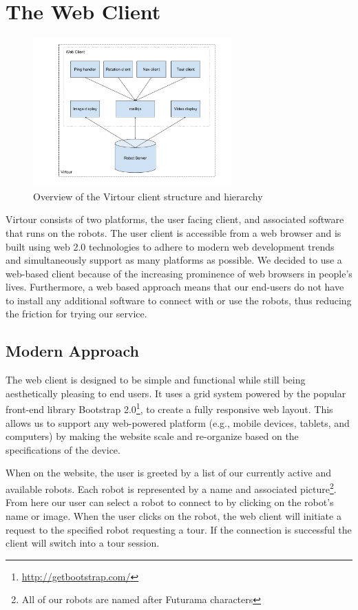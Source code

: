 \documentclass[
  oneside,
  11pt, a4paper,
  footinclude=true,
  headinclude=true,
  cleardoublepage=empty
]{article}
\begin{document}
\section{The Web Client}\label{sec:client}

\begin{figure}
  \centering
  \includegraphics[width=3in]{virtour_client}
  \caption{Overview of the Virtour client structure and hierarchy}
  \label{fig:client}
\end{figure}

Virtour consists of two platforms, the user facing client, and associated
software that runs on the robots. The user client is accessible from a web
browser and is built using web 2.0 technologies to adhere to modern web
development trends and simultaneously support as many platforms as possible. We
decided to use a web-based client because of the increasing prominence of web
browsers in people's lives. Furthermore, a web based approach means that our
end-users do not have to install any additional software to connect with or use
the robots, thus reducing the friction for trying our service.

\subsection{Modern Approach}

The web client is designed to be simple and functional while still being
aesthetically pleasing to end users. It uses a grid system powered by the
popular front-end library Bootstrap
2.0\footnote{\url{http://getbootstrap.com/}}, to create a fully responsive web
layout. This allows us to support any web-powered platform (e.g., mobile
devices, tablets, and computers) by making the website scale and re-organize
based on the specifications of the device.

When on the website, the user is greeted by a list of our currently active and
available robots. Each robot is represented by a name and associated
picture\footnote{All of our robots are named after Futurama characters}. From
here our user can select a robot to connect to by clicking on the robot's name
or image. When the user clicks on the robot, the web client will initiate a
request to the specified robot requesting a tour. If the connection is
successful the client will switch into a tour session.
\end{document}
